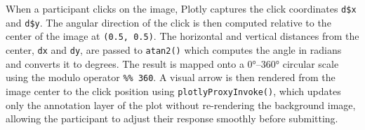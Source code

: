 \documentclass[
]{article}
\newenvironment{Shaded}{\begin{snugshade}}{\end{snugshade}}
\newcommand{\AttributeTok}[1]{\textcolor[rgb]{0.40,0.45,0.13}{#1}}
\newcommand{\CommentTok}[1]{\textcolor[rgb]{0.37,0.37,0.37}{#1}}
\newcommand{\DecValTok}[1]{\textcolor[rgb]{0.68,0.00,0.00}{#1}}
\newcommand{\FloatTok}[1]{\textcolor[rgb]{0.68,0.00,0.00}{#1}}
\newcommand{\FunctionTok}[1]{\textcolor[rgb]{0.28,0.35,0.67}{#1}}
\newcommand{\NormalTok}[1]{\textcolor[rgb]{0.00,0.23,0.31}{#1}}
\newcommand{\OtherTok}[1]{\textcolor[rgb]{0.00,0.23,0.31}{#1}}
\newcommand{\SpecialCharTok}[1]{\textcolor[rgb]{0.37,0.37,0.37}{#1}}
\newcommand{\StringTok}[1]{\textcolor[rgb]{0.13,0.47,0.30}{#1}}
\begin{document}
When a participant clicks on the image, Plotly captures the click
coordinates \texttt{d\$x} and \texttt{d\$y}. The angular direction of
the click is then computed relative to the center of the image at
\texttt{(0.5,\ 0.5)}. The horizontal and vertical distances from the
center, \texttt{dx} and \texttt{dy}, are passed to \texttt{atan2()}
which computes the angle in radians and converts it to degrees. The
result is mapped onto a 0°--360° circular scale using the modulo
operator \texttt{\%\%\ 360}. A visual arrow is then rendered from the
image center to the click position using \texttt{plotlyProxyInvoke()},
which updates only the annotation layer of the plot without re-rendering
the background image, allowing the participant to adjust their response
smoothly before submitting.

\begin{Shaded}
\end{Shaded}
\end{document}
